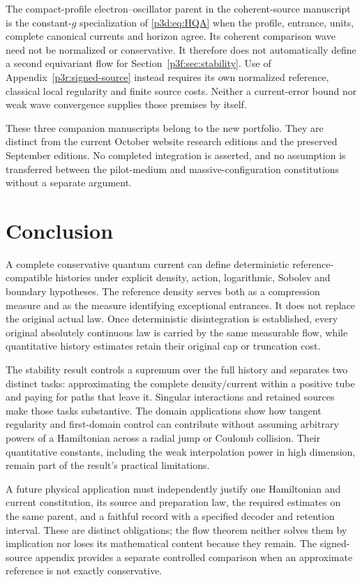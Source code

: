 \documentclass[11pt]{article}
\numberwithin{equation}{section}
\theoremstyle{definition}
\theoremstyle{remark}
\begin{document}
The compact-profile electron--oscillator parent in the coherent-source
manuscript~\cite{RodgersP4} is the constant-$g$ specialization of
\eqref{p3d:eq:HQA} when the profile, entrance, units, complete canonical
currents and horizon agree. Its coherent comparison wave need not be
normalized or conservative. It therefore does not automatically define
a second equivariant flow for Section~\ref{p3f:sec:stability}.
Use of Appendix~\ref{p3r:signed-source} instead requires its own
normalized reference, classical local regularity and finite source
costs. Neither a current-error bound nor weak wave convergence supplies
those premises by itself.

These three companion manuscripts belong to the new portfolio. They
are distinct from the current October website research editions and
the preserved September editions. No completed integration is asserted,
and no assumption is transferred between the pilot-medium and
massive-configuration constitutions without a separate argument.

\section{Conclusion}\label{p3r:conclusion}
A complete conservative quantum current can define deterministic reference-compatible histories under explicit density, action, logarithmic, Sobolev and boundary hypotheses. The reference density serves both as a compression measure and as the measure identifying exceptional entrances. It does not replace the original actual law. Once deterministic disintegration is established, every original absolutely continuous law is carried by the same measurable flow, while quantitative history estimates retain their original cap or truncation cost.

The stability result controls a supremum over the full history and separates two distinct tasks: approximating the complete density/current within a positive tube and paying for paths that leave it. Singular interactions and retained sources make those tasks substantive. The domain applications show how tangent regularity and first-domain control can contribute without assuming arbitrary powers of a Hamiltonian across a radial jump or Coulomb collision. Their quantitative constants, including the weak interpolation power in high dimension, remain part of the result's practical limitations.

A future physical application must independently justify one Hamiltonian and current constitution, its source and preparation law, the required estimates on the same parent, and a faithful record with a specified decoder and retention interval. These are distinct obligations; the flow theorem neither solves them by implication nor loses its mathematical content because they remain. The signed-source appendix provides a separate controlled comparison when an approximate reference is not exactly conservative.
\end{document}
